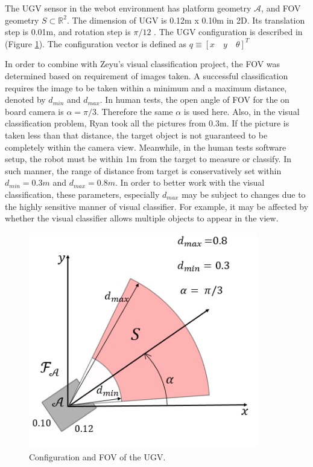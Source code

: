 \documentclass[12pt,draftcls,onecolumn]{IEEEtran}
\begin{document}
The UGV sensor in the webot environment has platform geometry $\mathcal{A}$, and FOV geometry $S \subset \mathbb{R}^2 $. 
The dimension of UGV is 0.12m x 0.10m in 2D.
Its translation step is 0.01m, and rotation step is $\pi/12$ .
The UGV configuration is described in  (Figure \ref{fig:1}).
The configuration vector is defined as $q \equiv [x  \quad  y  \quad  \theta]^T$



In order to combine with Zeyu's visual classification project, the FOV was determined based on requirement of  images taken. 
A successful classification requires the image to be taken within a minimum and a maximum distance, denoted by $d_{min}$ and  $d_{max}$. 
In human tests, the open angle of FOV for the on board camera is $\alpha =\pi/3 $. 
Therefore the same  $\alpha$ is used here.
Also, in the visual classification problem, Ryan took all the pictures from 0.3m.
If the picture is taken less than that distance, the target object is not guaranteed to be completely within the camera view.
Meanwhile, in the human tests software setup, the robot must be within 1m from the target to  measure or classify.
In such manner, the range of distance from target is conservatively set within $d_{min} = 0.3m$ and  $d_{max}=0.8 m$.
In order to better work with the visual classification, these parameters, especially $d_{max}$ may be subject to changes due to the highly sensitive manner of visual classifier. 
For example, it may be affected by whether the visual classifier allows multiple objects to appear in the view. 

\begin{figure}
 \centering
  \includegraphics[width=10cm]{figures/FOV}
  \caption{Configuration and FOV of the UGV.}
  \label{fig:1}
\end{figure}
\end{document}
